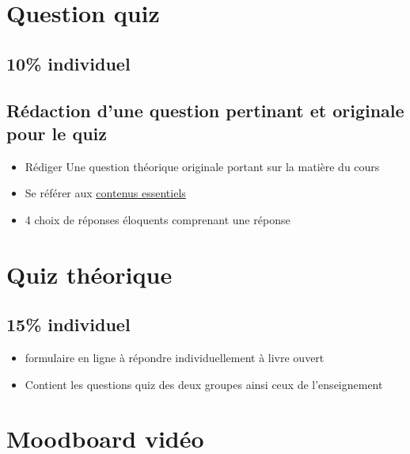 \documentclass[
]{book}
\providecommand{\tightlist}{%
  \setlength{\itemsep}{0pt}\setlength{\parskip}{0pt}}
\begin{document}
\hypertarget{evaluation_2}{%
\section{Question quiz}\label{evaluation_2}}

\hypertarget{individuel-1}{%
\subsection{10\% individuel}\label{individuel-1}}

\hypertarget{ruxe9daction-dune-question-pertinant-et-originale-pour-le-quiz}{%
\subsection{Rédaction d'une question pertinant et originale pour le quiz}\label{ruxe9daction-dune-question-pertinant-et-originale-pour-le-quiz}}

\begin{itemize}
\tightlist
\item
  Rédiger Une question théorique originale portant sur la matière du cours
\item
  Se référer aux \protect\hyperlink{contenus_essentiels}{contenus essentiels}
\item
  4 choix de réponses éloquents comprenant une réponse
\end{itemize}

\hypertarget{evaluation_3}{%
\section{Quiz théorique}\label{evaluation_3}}

\hypertarget{individuel-2}{%
\subsection{15\% individuel}\label{individuel-2}}

\begin{itemize}
\tightlist
\item
  formulaire en ligne à répondre individuellement à livre ouvert
\item
  Contient les questions quiz des deux groupes ainsi ceux de l'enseignement
\end{itemize}

\hypertarget{evaluation_4}{%
\section{Moodboard vidéo}\label{evaluation_4}}
\end{document}
